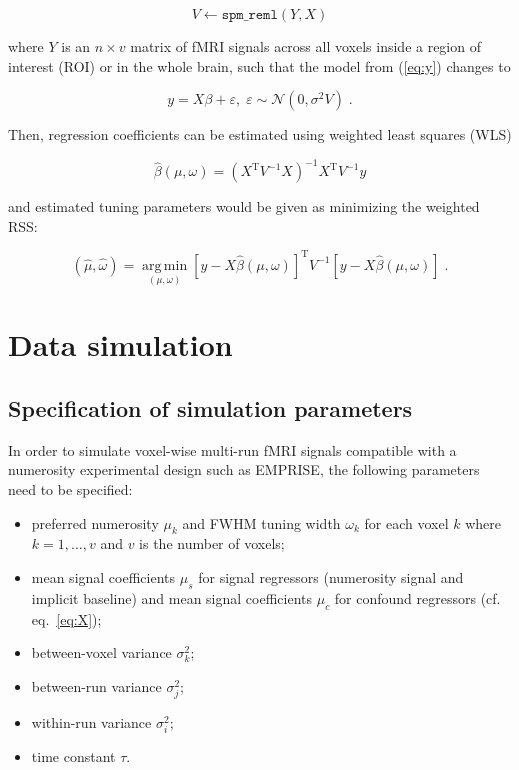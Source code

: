 \documentclass[a4paper,12pt]{article}
\begin{document}
\begin{equation} \label{eq:ReML}
V \leftarrow \mathtt{spm\_reml}(Y, X)
\end{equation}

where $Y$ is an $n \times v$ matrix of fMRI signals across all voxels inside a region of interest (ROI) or in the whole brain, such that the model from (\ref{eq:y}) changes to

\begin{equation} \label{eq:y-X-V}
y = X \beta + \varepsilon, \; \varepsilon \sim \mathcal{N}(0, \sigma^2 V) \; .
\end{equation}

Then, regression coefficients can be estimated using weighted least squares (WLS)

\begin{equation} \label{eq:b-est-X-V}
\hat{\beta}(\mu,\omega) = (X^\mathrm{T} V^{-1} X)^{-1} X^\mathrm{T} V^{-1} y
\end{equation}

and estimated tuning parameters would be given as minimizing the weighted RSS:

\begin{equation} \label{eq:mu-tw-est-X-V}
(\hat{\mu},\hat{\omega}) = \operatorname*{arg\,min}_{(\mu,\omega)} \left[ y - X \hat{\beta}(\mu,\omega) \right]^\mathrm{T} V^{-1} \left[ y - X \hat{\beta}(\mu,\omega) \right] \; .
\end{equation}


\section{Data simulation} \label{sec:Sim}

\subsection{Specification of simulation parameters}

In order to simulate voxel-wise multi-run fMRI signals compatible with a numerosity experimental design such as EMPRISE, the following parameters need to be specified:

\begin{itemize}
	
\item preferred numerosity $\mu_k$ and FWHM tuning width $\omega_k$ for each voxel $k$ where $k = 1,\ldots,v$ and $v$ is the number of voxels;

\item mean signal coefficients $\mu_s$ for signal regressors (numerosity signal and implicit baseline) and mean signal coefficients $\mu_c$ for confound regressors (cf. eq.~\ref{eq:X});

\item between-voxel variance $\sigma_k^2$;

\item between-run variance $\sigma_j^2$;

\item within-run variance $\sigma_i^2$;

\item time constant $\tau$.

\end{itemize}
\end{document}
